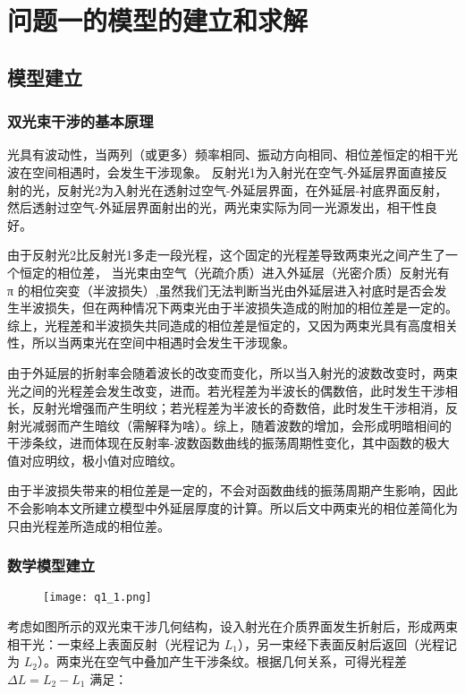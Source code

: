 \documentclass[withoutpreface,bwprint]{cumcmthesis}
\begin{document}
\section{问题一的模型的建立和求解}
\subsection{模型建立}
\subsubsection{双光束干涉的基本原理}
光具有波动性，当两列（或更多）频率相同、振动方向相同、相位差恒定的相干光波在空间相遇时，会发生干涉现象。
反射光1为入射光在空气-外延层界面直接反射的光，反射光2为入射光在透射过空气-外延层界面，在外延层-衬底界面反射，然后透射过空气-外延层界面射出的光，两光束实际为同一光源发出，相干性良好。

由于反射光2比反射光1多走一段光程，这个固定的光程差导致两束光之间产生了一个恒定的相位差， 
当光束由空气（光疏介质）进入外延层（光密介质）反射光有 π 的相位突变（半波损失）,虽然我们无法判断当光由外延层进入衬底时是否会发生半波损失，但在两种情况下两束光由于半波损失造成的附加的相位差是一定的。综上，光程差和半波损失共同造成的相位差是恒定的，又因为两束光具有高度相关性，所以当两束光在空间中相遇时会发生干涉现象。

由于外延层的折射率会随着波长的改变而变化，所以当入射光的波数改变时，两束光之间的光程差会发生改变，进而。若光程差为半波长的偶数倍，此时发生干涉相长，反射光增强而产生明纹；若光程差为半波长的奇数倍，此时发生干涉相消，反射光减弱而产生暗纹（需解释为啥）。综上，随着波数的增加，会形成明暗相间的干涉条纹，进而体现在反射率-波数函数曲线的振荡周期性变化，其中函数的极大值对应明纹，极小值对应暗纹。

由于半波损失带来的相位差是一定的，不会对函数曲线的振荡周期产生影响，因此不会影响本文所建立模型中外延层厚度的计算。所以后文中两束光的相位差简化为只由光程差所造成的相位差。
\subsubsection{数学模型建立}
\begin{figure}[H]
	\centering
	\texttt{[image: q1\_1.png]}
	\caption{}
	\label{fig:q1_1}
	\end{figure}
考虑如图所示的双光束干涉几何结构，设入射光在介质界面发生折射后，形成两束相干光：一束经上表面反射（光程记为 $L_1$），另一束经下表面反射后返回（光程记为 $L_2$）。两束光在空气中叠加产生干涉条纹。根据几何关系，可得光程差 $\Delta L = L_2 - L_1$ 满足：
\end{document}
